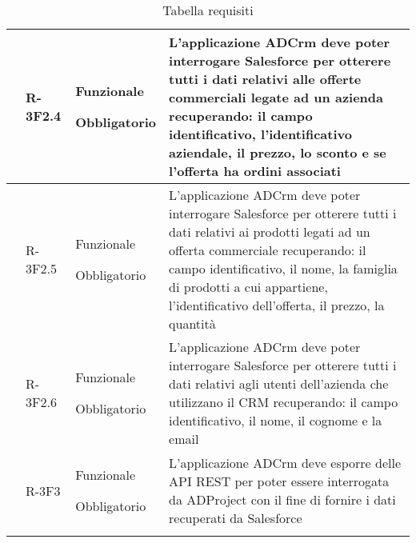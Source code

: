 \begin{longtable}{|r l|p{2.5cm}|p{10cm}|}
\begin{tikzpicture}
	\end{tikzpicture} & \hypertarget{R-3F2.4}{R-3F2.4} & Funzionale
	
	Obbligatorio & L'applicazione ADCrm deve poter interrogare Salesforce per otterere tutti i dati relativi alle offerte commerciali legate ad un azienda recuperando: il campo identificativo, l'identificativo aziendale, il prezzo, lo sconto e se l'offerta ha ordini associati \tabularnewline
	\hline
	\begin{tikzpicture}

	\end{tikzpicture} & \hypertarget{R-3F2.5}{R-3F2.5} & Funzionale
	
	Obbligatorio & L'applicazione ADCrm deve poter interrogare Salesforce per otterere tutti i dati relativi ai prodotti legati ad un offerta commerciale recuperando: il campo identificativo, il nome, la famiglia di prodotti a cui appartiene, l'identificativo dell'offerta, il prezzo, la quantità\tabularnewline
	\hline
	\begin{tikzpicture}

	\end{tikzpicture} & \hypertarget{R-3F2.6}{R-3F2.6} & Funzionale
	
	Obbligatorio & L'applicazione ADCrm deve poter interrogare Salesforce per otterere tutti i dati relativi agli utenti dell'azienda che utilizzano il CRM recuperando: il campo identificativo, il nome, il cognome e la email\tabularnewline
	\hline
	& \hypertarget{R-3F3}{R-3F3} & Funzionale
	
	Obbligatorio & L'applicazione ADCrm deve esporre delle API REST per poter essere interrogata da ADProject con il fine di fornire i dati recuperati da Salesforce\tabularnewline
	\hline
	\caption{Tabella requisiti} 
	\tabularnewline
\end{longtable}

